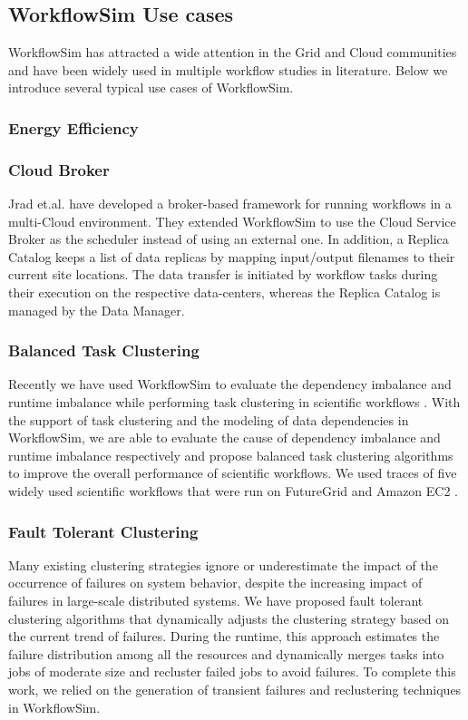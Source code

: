 \subsection{WorkflowSim Use cases}

WorkflowSim has attracted a wide attention in the Grid and Cloud communities and have been widely used in multiple workflow studies in literature. Below we introduce several typical use cases of WorkflowSim. 
\subsubsection{Energy Efficiency}


\subsubsection{Cloud Broker}
Jrad et.al. \cite{jrad2013broker} have developed a broker-based framework for running workflows in a multi-Cloud environment. They extended WorkflowSim to use the Cloud Service Broker as the scheduler instead of using an external one. In addition, a Replica Catalog keeps a list of data replicas by mapping input/output filenames to their current site locations. The data transfer is initiated by workflow tasks during their execution on the respective data-centers, whereas the Replica Catalog is managed by the Data Manager. 


\subsubsection{Balanced Task Clustering}
Recently we have used WorkflowSim to evaluate the dependency imbalance and runtime imbalance while performing task clustering in scientific workflows \cite{Chen2013b, Chen2013a}. With the support of task clustering and the modeling of data dependencies in WorkflowSim, we are able to evaluate the cause of dependency imbalance and runtime imbalance respectively and propose balanced task clustering algorithms to improve the overall performance of scientific workflows. We used traces of five widely used scientific workflows that were run on FutureGrid \cite{FutureGrid} and Amazon EC2 \cite{AmazonEC2}. 

\subsubsection{Fault Tolerant Clustering}
Many existing clustering strategies ignore or underestimate the impact of the occurrence of failures on system behavior, despite the increasing impact of failures in large-scale distributed systems. We have proposed fault tolerant clustering algorithms \cite{Chen2012} that dynamically adjusts the clustering strategy based on the current trend of failures. During the runtime, this approach estimates the failure distribution among all the resources and dynamically merges tasks into jobs of moderate size and recluster failed jobs to avoid failures. To complete this work, we relied on the generation of transient failures and reclustering techniques in WorkflowSim. 


